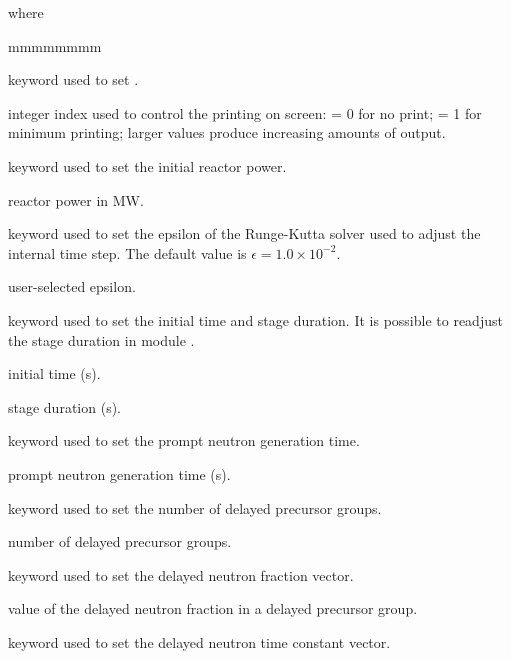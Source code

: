 \noindent where
\begin{ListeDeDescription}{mmmmmmmm}

\item[\moc{EDIT}] keyword used to set .

\item[\dusa{iprint}] integer index used to control the printing on screen:
= 0 for no print; = 1 for minimum printing; larger values produce
increasing amounts of output.

\item[\moc{POWER}] keyword used to set the initial reactor power.

\item[\dusa{power}] reactor power in MW.

\item[\moc{EPSILON}] keyword used to set the epsilon of the Runge-Kutta solver used to adjust the internal time step. The default value is $\epsilon=1.0\times 10^{-2}$.

\item[\dusa{epsilon}] user-selected epsilon.

\item[\moc{TIME}] keyword used to set the initial time and stage duration. It is possible to readjust the stage duration in module .

\item[\dusa{t0}] initial time (s).

\item[\dusa{dt}] stage duration (s).

\item[\moc{LAMBDA}] keyword used to set the prompt neutron generation time.

\item[\dusa{lambda}] prompt neutron generation time (s).

\item[\moc{NGROUP}] keyword used to set the number of delayed precursor groups.

\item[\dusa{ngroup}] number of delayed precursor groups.

\item[\moc{BETAI}] keyword used to set the delayed neutron fraction vector.

\item[\dusa{betai}] value of the delayed neutron fraction in a delayed precursor group.

\item[\moc{LAMBDAI}] keyword used to set the delayed neutron time constant vector.


\end{ListeDeDescription}
